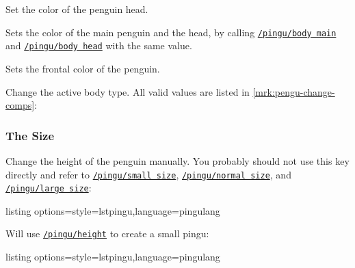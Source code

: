 \documentclass[parskip=half,english,numbers=noenddot,footnotes=nomultiple,oneside]{scrartcl}
\def\lpingu#1{\lstinline[style=lstpingu,language=pingulang]'#1'}
\newcommand*\keyref[2][/pingu/]{\hyperref[pk:#1#2]{\lpingu{#1#2}}}
\begin{document}
	Set the color of the penguin head.%
\begin{tcblisting}{}
\begin{tikzpicture}
	\pingu[body head=green]
\end{tikzpicture}
\end{tcblisting}
\endkeyexplain

	Sets the color of the main penguin and the head, by calling \keyref{body main} and \keyref{body head} with the same value.
\begin{tcblisting}{}
\begin{tikzpicture}
	\pingu[body=green]
\end{tikzpicture}
\end{tcblisting}
\endkeyexplain

	Sets the frontal color of the penguin.
\begin{tcblisting}{}
\begin{tikzpicture}
	\pingu[body front=green]
\end{tikzpicture}
\end{tcblisting}
\endkeyexplain


	Change the active body type. All valid values are listed in \autoref{mrk:pengu-change-comps}:
\begin{tcblisting}{}
\begin{tikzpicture}
	\pingu[body type=chubby]
\end{tikzpicture}
\end{tcblisting}
\endkeyexplain

\subsubsection{The Size}

	Change the height of the penguin manually. You probably should not use this key directly and refer to \keyref{small size}, \keyref{normal size}, and \keyref{large size}:
\begin{tcblisting}{listing options={style=lstpingu,language=pingulang}}
\begin{tikzpicture}
	\pingu[height=17mm]
\end{tikzpicture}
\end{tcblisting}
\endkeyexplain

	Will use \keyref{height} to create a small pingu:
\begin{tcblisting}{listing options={style=lstpingu,language=pingulang}}
\end{tcblisting}
\endkeyexplain
\end{document}
